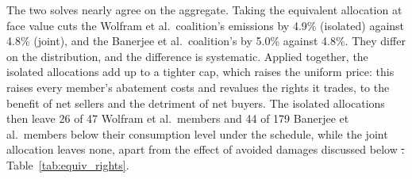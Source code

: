 \documentclass[12pt,english]{article}
\theoremstyle{remark}
\providecommand{\DIFaddtex}[1]{{\protect\color{blue}\uwave{#1}}} %
\providecommand{\DIFdeltex}[1]{{\protect\color{red}\sout{#1}}}                      %
\providecommand{\DIFaddbegin}{} %
\providecommand{\DIFaddend}{} %
\providecommand{\DIFdelbegin}{} %
\providecommand{\DIFdelend}{} %
\providecommand{\DIFadd}[1]{\texorpdfstring{\DIFaddtex{#1}}{#1}} %
\providecommand{\DIFdel}[1]{\texorpdfstring{\DIFdeltex{#1}}{}} %
\newcommand{\DIFscaledelfig}{0.5}
\newlength{\DIFdelgraphicswidth} %
\newlength{\DIFdelgraphicsheight} %
\newcommand{\DIFaddincludegraphics}[2][]{{\color{blue}\fbox{\DIFOincludegraphics[#1]{#2}}}} %
\newcommand{\DIFdelincludegraphics}[2][]{%
\sbox{\DIFdelgraphicsbox}{\DIFOincludegraphics[#1]{#2}}%
\settoboxwidth{\DIFdelgraphicswidth}{\DIFdelgraphicsbox} %
\settoboxtotalheight{\DIFdelgraphicsheight}{\DIFdelgraphicsbox} %
\scalebox{\DIFscaledelfig}{%
\parbox[b]{\DIFdelgraphicswidth}{\usebox{\DIFdelgraphicsbox}\\[-\baselineskip] \rule{\DIFdelgraphicswidth}{0em}}\llap{\resizebox{\DIFdelgraphicswidth}{\DIFdelgraphicsheight}{%
\setlength{\unitlength}{\DIFdelgraphicswidth}%
\begin{picture}(1,1)%
\thicklines\linethickness{2pt} %
{\color[rgb]{1,0,0}\put(0,0){\framebox(1,1){}}}%
{\color[rgb]{1,0,0}\put(0,0){\line( 1,1){1}}}%
{\color[rgb]{1,0,0}\put(0,1){\line(1,-1){1}}}%
\end{picture}%
}\hspace*{3pt}}} %
} %
\DeclareRobustCommand{\DIFaddbegin}{\DIFOaddbegin \let\includegraphics\DIFaddincludegraphics} %
\DeclareRobustCommand{\DIFaddend}{\DIFOaddend \let\includegraphics\DIFOincludegraphics} %
\DeclareRobustCommand{\DIFdelbegin}{\DIFOdelbegin \let\includegraphics\DIFdelincludegraphics} %
\DeclareRobustCommand{\DIFdelend}{\DIFOaddend \let\includegraphics\DIFOincludegraphics} %
\begin{document}
The two solves nearly agree on the aggregate. Taking the equivalent allocation at face value cuts the Wolfram et al.\ coalition's emissions by 4.9\% (isolated) against 4.8\% (joint), and the Banerjee et al.\ coalition's by 5.0\% against 4.8\%. They differ on the distribution, and the difference is systematic. %
Applied together, the isolated allocations add up to a tighter cap, which raises the uniform price: this raises every member's abatement costs and revalues the rights it trades, to the benefit of net sellers and the detriment of net buyers. The isolated allocations then leave 26 of 47 Wolfram et al.\ members and 44 of 179 Banerjee et al.\ members below their consumption level under the schedule, while the joint allocation leaves none, apart from the effect of avoided damages discussed below \DIFdelbegin \DIFdel{. }\DIFdelend \DIFaddbegin \DIFadd{(}\DIFaddend Table~\ref{tab:equiv_rights}\DIFaddbegin \DIFadd{)}\DIFaddend .


\end{document}
